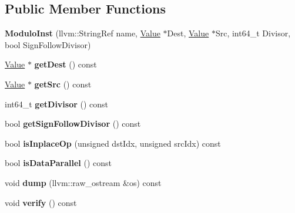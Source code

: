 \subsection*{Public Member Functions}
\begin{DoxyCompactItemize}
\item 
\mbox{\label{classglow_1_1_modulo_inst_a5a398121ca8ce0b94efda3494e67f9e4}} 
{\bfseries Modulo\+Inst} (llvm\+::\+String\+Ref name, \hyperlink{classglow_1_1_value}{Value} $\ast$Dest, \hyperlink{classglow_1_1_value}{Value} $\ast$Src, int64\+\_\+t Divisor, bool Sign\+Follow\+Divisor)
\item 
\mbox{\label{classglow_1_1_modulo_inst_a7be79e79e191f583d2dec7d0d787ff41}} 
\hyperlink{classglow_1_1_value}{Value} $\ast$ {\bfseries get\+Dest} () const
\item 
\mbox{\label{classglow_1_1_modulo_inst_a9527d1a51b7413bccd4914d7e7fe0e7c}} 
\hyperlink{classglow_1_1_value}{Value} $\ast$ {\bfseries get\+Src} () const
\item 
\mbox{\label{classglow_1_1_modulo_inst_aef8369b26d2ccef47722ca4205beee25}} 
int64\+\_\+t {\bfseries get\+Divisor} () const
\item 
\mbox{\label{classglow_1_1_modulo_inst_a410f3c347854879dabf908ed8de662c7}} 
bool {\bfseries get\+Sign\+Follow\+Divisor} () const
\item 
\mbox{\label{classglow_1_1_modulo_inst_ada07aa3e9c01598b212595c200669cab}} 
bool {\bfseries is\+Inplace\+Op} (unsigned dst\+Idx, unsigned src\+Idx) const
\item 
\mbox{\label{classglow_1_1_modulo_inst_ab34fe9374d5a28b61703c521e39d667d}} 
bool {\bfseries is\+Data\+Parallel} () const
\item 
\mbox{\label{classglow_1_1_modulo_inst_af043dd9cc2305ea983e9643289516923}} 
void {\bfseries dump} (llvm\+::raw\+\_\+ostream \&os) const
\item 
\mbox{\label{classglow_1_1_modulo_inst_a05dcd93831d7c3b3723bb7fb4981bb31}} 
void {\bfseries verify} () const
\end{DoxyCompactItemize}
